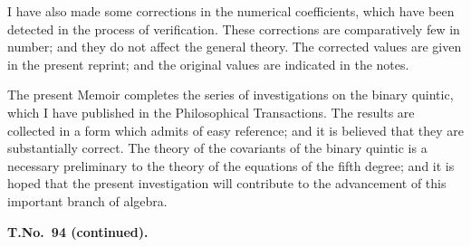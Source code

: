 \documentclass[11pt,a4paper]{article}
\begin{document}
I have also made some corrections in the numerical coefficients, which have been detected in the process of verification. These corrections are comparatively few in number; and they do not affect the general theory. The corrected values are given in the present reprint; and the original values are indicated in the notes.

The present Memoir completes the series of investigations on the binary quintic, which I have published in the Philosophical Transactions. The results are collected in a form which admits of easy reference; and it is believed that they are substantially correct. The theory of the covariants of the binary quintic is a necessary preliminary to the theory of the equations of the fifth degree; and it is hoped that the present investigation will contribute to the advancement of this important branch of algebra.

\clearpage
\setcounter{page}{293}

\begin{center}
\textbf{T.\quad No.\ 94 (continued).}
\end{center}
\end{document}
